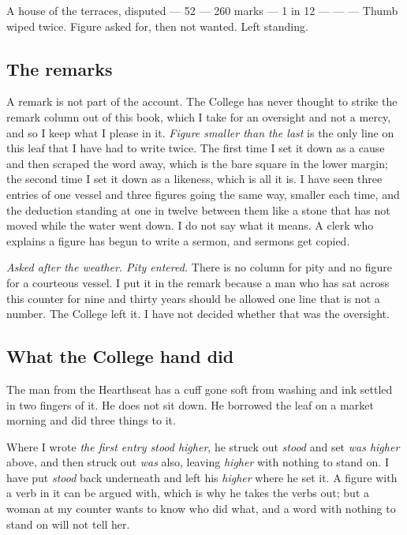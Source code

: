 \documentclass{design/chronicle}
\begin{document}
A house of the terraces, disputed — 52 — 260 marks — 1 in 12 — — — Thumb wiped twice. Figure asked for, then not wanted. Left standing.\par

\subsection*{The remarks}

A remark is not part of the account. The College has never thought to strike the remark column out of this book, which I take for an oversight and not a mercy, and so I keep what I please in it. \emph{Figure smaller than the last} is the only line on this leaf that I have had to write twice. The first time I set it down as a cause and then scraped the word away, which is the bare square in the lower margin; the second time I set it down as a likeness, which is all it is. I have seen three entries of one vessel and three figures going the same way, smaller each time, and the deduction standing at one in twelve between them like a stone that has not moved while the water went down. I do not say what it means. A clerk who explains a figure has begun to write a sermon, and sermons get copied.

\emph{Asked after the weather. Pity entered.} There is no column for pity and no figure for a courteous vessel. I put it in the remark because a man who has sat across this counter for nine and thirty years should be allowed one line that is not a number. The College left it. I have not decided whether that was the oversight.

\subsection*{What the College hand did}

The man from the Hearthseat has a cuff gone soft from washing and ink settled in two fingers of it. He does not sit down. He borrowed the leaf on a market morning and did three things to it.

Where I wrote \emph{the first entry stood higher}, he struck out \emph{stood} and set \emph{was higher} above, and then struck out \emph{was} also, leaving \emph{higher} with nothing to stand on. I have put \emph{stood} back underneath and left his \emph{higher} where he set it. A figure with a verb in it can be argued with, which is why he takes the verbs out; but a woman at my counter wants to know who did what, and a word with nothing to stand on will not tell her.
\end{document}
